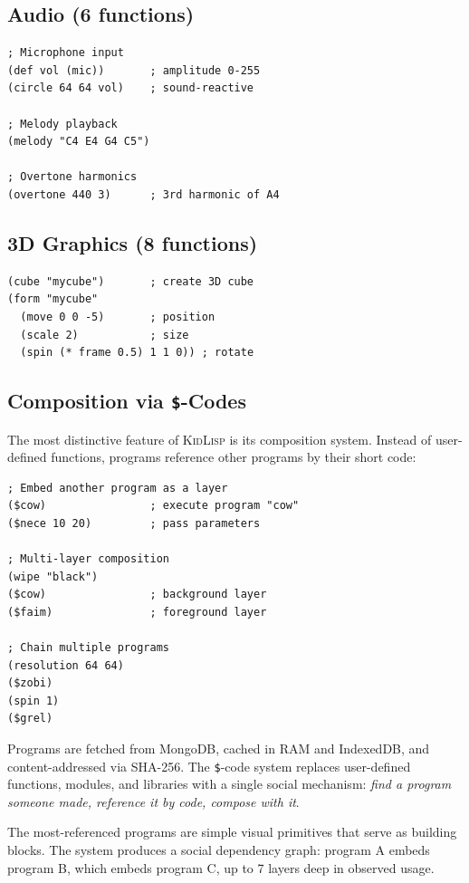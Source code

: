 \documentclass[10pt,letterpaper,twocolumn]{article}
\newcommand{\kl}{\textsc{KidLisp}}
\begin{document}
\subsection{Audio (6 functions)}

\begin{lstlisting}
; Microphone input
(def vol (mic))       ; amplitude 0-255
(circle 64 64 vol)    ; sound-reactive

; Melody playback
(melody "C4 E4 G4 C5")

; Overtone harmonics
(overtone 440 3)      ; 3rd harmonic of A4
\end{lstlisting}

\subsection{3D Graphics (8 functions)}

\begin{lstlisting}
(cube "mycube")       ; create 3D cube
(form "mycube"
  (move 0 0 -5)       ; position
  (scale 2)           ; size
  (spin (* frame 0.5) 1 1 0)) ; rotate
\end{lstlisting}

\subsection{Composition via \texttt{\$}-Codes}

The most distinctive feature of \kl{} is its composition system. Instead of user-defined functions, programs reference other programs by their short code:

\begin{lstlisting}
; Embed another program as a layer
($cow)                ; execute program "cow"
($nece 10 20)         ; pass parameters

; Multi-layer composition
(wipe "black")
($cow)                ; background layer
($faim)               ; foreground layer

; Chain multiple programs
(resolution 64 64)
($zobi)
(spin 1)
($grel)
\end{lstlisting}

Programs are fetched from MongoDB, cached in RAM and IndexedDB, and content-addressed via SHA-256. The \texttt{\$}-code system replaces user-defined functions, modules, and libraries with a single social mechanism: \emph{find a program someone made, reference it by code, compose with it}.

The most-referenced programs are simple visual primitives that serve as building blocks. The system produces a social dependency graph: program A embeds program B, which embeds program C, up to 7 layers deep in observed usage.
\end{document}
